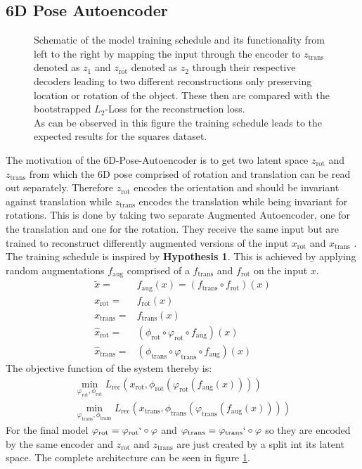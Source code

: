 \documentclass[10pt,a4paper]{article}
\newcommand{\rot}{\ensuremath{\text{rot}\xspace}}
\newcommand{\trans}{\ensuremath{\text{trans}\xspace}}
\begin{document}
\subsection{6D Pose Autoencoder}\label{6D Pose Autoencoder}
\begin{figure}[htb]
    \centering
    
    \caption{Schematic of the model training schedule and its functionality from left to the right by mapping the input through the encoder to $z_{\trans}$ denoted as $z_1$ and $z_{\rot}$ denoted as $z_2$ through their respective decoders leading to two different reconstructions only preserving location or rotation of the object. These then are compared with the bootstrapped $L_2$-Loss for the reconstruction loss.\\
    As can be observed in this figure the training schedule leads to the expected results for the squares dataset.} \label{model_square}
\end{figure}
The motivation of the 6D-Pose-Autoencoder is to get two latent space $z_{\rot}$ and $z_{\trans}$ from which the 6D pose comprised of rotation and translation can be read out separately.
Therefore $z_{\rot}$ encodes the orientation and should be invariant against translation while $z_{\trans}$ encodes the translation while being invariant for rotations. This is done by taking two separate Augmented Autoencoder, one for the translation and one for the rotation. They receive the same input but are trained to reconstruct differently augmented versions of the input $x_{\rot}$ and $x_{\trans}$ . The training schedule is inspired by \textbf{Hypothesis 1}.
This is achieved by applying random augmentations $f_{\text{aug}}$ comprised of a $f_{\trans}$ and $f_{\rot}$ on the input $x$. 
\begin{equation}
    \begin{aligned}
        \tilde{x} = &f_{\text{aug}} (x) = (f_{\trans} \circ f_{\rot} ) (x) \\
        x_{\rot} =&f_{\rot} (x) \\
        x_{\trans} =&f_{\trans} (x) \\
        \hat{x}_{\rot} =& (\phi_{\rot} \circ \varphi_{\rot} \circ f_{\text{aug}}) (x) \\
        \hat{x}_{\trans} = &(\phi_{\trans} \circ \varphi_{\trans} \circ f_{\text{aug}}) (x)
    \end{aligned}
\end{equation}
The objective function of the system thereby is:
\begin{equation}
    \begin{aligned}
        \min_{\varphi_{\rot}, \phi_{\rot}}  L_{\text{rec}}(x_{\rot}, \phi_{\rot}(\varphi_{\rot}(f_{\text{aug}}(x) ))) \\
        \min_{\varphi_{\trans}, \phi_{\trans}}  L_{\text{rec}}(x_{\trans}, \phi_{\trans}(\varphi_{\trans}(f_{\text{aug}}(x) ))) 
    \end{aligned}
\end{equation}
For the final model $\varphi_{\rot} = \varphi_{\rot}` \circ \varphi$ and $\varphi_{\trans}= \varphi_{\trans}` \circ \varphi$ so they are encoded by the same encoder and $z_{\rot}$ and $z_{\trans}$ are just created by a split int its latent space. The complete architecture can be seen in figure \ref{model_square}.
\end{document}
